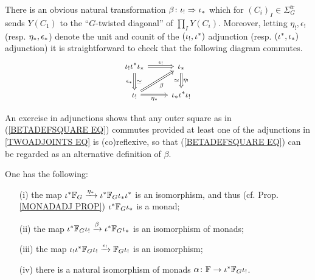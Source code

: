 \documentclass[a4paper,10pt]{article}%
\begin{document}
There is an obvious natural transformation $\beta \colon \iota_! \Rightarrow \iota_{\**}$ which for 
$(C_i)_I \in \Sigma_G^{\text{fr}}$
sends $Y(C_1)$ to the ``$G$-twisted diagonal'' of 
$\prod_I Y(C_i)$.
Moreover, letting $\eta_!,\epsilon_!$ 
(resp. $\eta_{\**},\epsilon_{\**}$)
denote the unit and counit of the $(\iota_!,\iota^{\**})$ adjunction 
(resp. $(\iota^{\**},\iota_{\**})$ adjunction)
it is straightforward to check that the following diagram commutes.
\begin{equation}\label{BETADEFSQUARE EQ}
\begin{tikzcd}
		\iota_{!} \iota^{\**} \iota_{\**}
		\ar[Rightarrow]{r}{\epsilon_!}
		\ar[Rightarrow]{d}{\simeq}[swap]{\epsilon_{\**}}
	&
		\iota_{\**}
		\ar[Rightarrow]{d}{\eta_{!}}[swap]{\simeq}
\\
		\iota_!
		\ar[Rightarrow]{r}[swap]{\eta_{\**}}
		\ar[Rightarrow]{ru}[swap]{\beta}
	&
		\iota_{\**} \iota^{\**} \iota_{!}
\end{tikzcd}
\end{equation}
\begin{remark} An exercise in adjunctions shows that any outer square as in (\ref{BETADEFSQUARE EQ})
 commutes provided at least one of the adjunctions in \ref{TWOADJOINTS EQ} is (co)reflexive, so that (\ref{BETADEFSQUARE EQ}) can be regarded as an alternative definition of $\beta$.
\end{remark}


\begin{proposition}
        \label{MONAD_COMPARISON_PROP}
	One has the following:
\begin{itemize}
	\item[(i)]
	the map 
	$\iota^{\**} \mathbb{F}_G
		\xrightarrow{\eta_{\**}}
	\iota^{\**} \mathbb{F}_G \iota_{\**} \iota^{\**}$
	is an isomorphism, 
	and thus (cf. Prop. \ref{MONADADJ PROP})
	$\iota^{\**} \mathbb{F}_G \iota_{\**}$
	is a monad;
	\item[(ii)] the map 
	$\iota^{\**} \mathbb{F}_G \iota_{!}
	\xrightarrow{\beta}	
	\iota^{\**} \mathbb{F}_G \iota_{\**}$ is an isomorphism of monads;
	\item[(iii)] the map 
	$\iota_{!}\iota^{\**} \mathbb{F}_G \iota_{!}
	\xrightarrow{\epsilon_!}
	\mathbb{F}_G \iota_{!}$ is an isomorphism;
	\item[(iv)] there is a natural isomorphism of monads
	$\alpha \colon \mathbb{F} \to \iota^{\**} \mathbb{F}_G \iota_{!}$.
\end{itemize}
\end{proposition}
\end{document}

